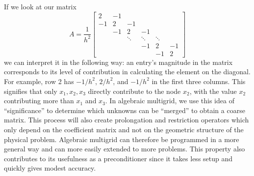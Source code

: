 \documentclass[11pt]{article}
\begin{document}
If we look at our matrix \[
A = \frac{1}{h^2}
\begin{bmatrix}
2  & -1 &        &        &        &   \\
-1 &  2 & -1     &        &        &   \\
   & -1 &  2     &     -1 &        &   \\
   &    & \ddots & \ddots & \ddots &   \\
   &    &        &     -1 &      2 & -1 \\
   &    &        &        &     -1 &  2
\end{bmatrix}
\] we can interpret it in the following way: an entry's magnitude in the
matrix corresponds to its level of contribution in calculating the
element on the diagonal. For example, row 2 has \(-1/h^2\), \(2/h^2\),
and \(-1/h^2\) in the first three columns. This signifies that only
\(x_1, x_2, x_3\) directly contribute to the node \(x_2\), with the
value \(x_2\) contributing more than \(x_1\) and \(x_3\). In algebraic
multigrid, we use this idea of ``significance'' to determine which
unknowns can be ``merged'' to obtain a coarse matrix. This process will
also create prolongation and restriction operators which only depend on
the coefficient matrix and not on the geometric structure of the
physical problem. Algebraic multigrid can therefore be programmed in a
more general way and can more easily extended to more problems. This
property also contributes to its usefulness as a preconditioner since it
takes less setup and quickly gives modest accuracy.


    
    
    
\end{document}
